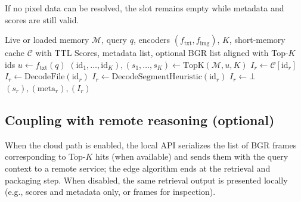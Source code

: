 If no pixel data can be resolved, the slot remains empty while metadata and
scores are still valid.

\begin{algorithm}[t]
\caption{Edge query with optional pixel materialization (V3)}
\label{alg:edge-query-v3}
\begin{algorithmic}[1]
\Require Live or loaded memory $\mathcal{M}$, query $q$, encoders
         $(f_{\mathrm{txt}}, f_{\mathrm{img}})$, $K$, short-memory cache
         $\mathcal{C}$ with TTL
\Ensure Scores, metadata list, optional BGR list aligned with Top-$K$ ids
\State $u \gets f_{\mathrm{txt}}(q)$
\State $(\mathrm{id}_1,\ldots,\mathrm{id}_K), (s_1,\ldots,s_K) \gets \mathrm{TopK}(\mathcal{M}, u, K)$
        \State $I_r \gets \mathcal{C}[\mathrm{id}_r]$
        \State $I_r \gets \mathrm{DecodeFile}(\mathrm{id}_r)$
        \State $I_r \gets \mathrm{DecodeSegmentHeuristic}(\mathrm{id}_r)$
    \Else
        \State $I_r \gets \bot$
    \EndIf
\EndFor
\State \Return $(s_r), (\mathrm{meta}_r), (I_r)$
\end{algorithmic}
\end{algorithm}

\subsection{Coupling with remote reasoning (optional)}
\label{sec:edge-cloud}

When the cloud path is enabled, the local API serializes the list of BGR frames
corresponding to Top-$K$ hits (when available) and sends them with the query
context to a remote service; the edge algorithm ends at the retrieval and
packaging step. When disabled, the same retrieval output is presented locally
(e.g., scores and metadata only, or frames for inspection).


